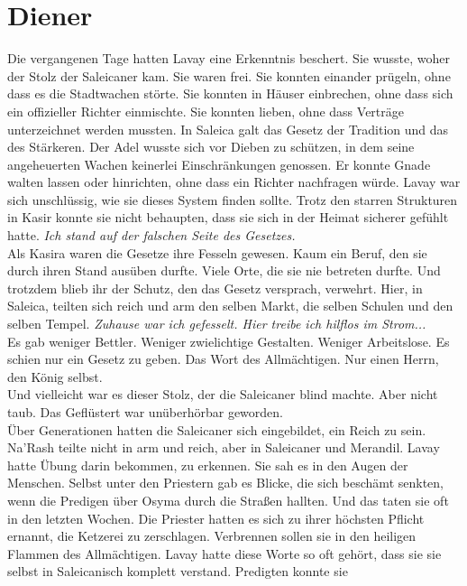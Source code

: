 \chapter{Diener}

Die vergangenen Tage hatten Lavay eine Erkenntnis beschert. Sie wusste, woher der Stolz der 
Saleicaner kam. Sie waren frei. Sie konnten einander prügeln, ohne dass es die Stadtwachen störte. 
Sie konnten in Häuser einbrechen, ohne dass sich ein offizieller Richter einmischte. Sie konnten 
lieben, ohne dass Verträge unterzeichnet werden mussten. In Saleica galt das Gesetz der Tradition 
und das des Stärkeren. Der Adel wusste sich vor Dieben zu schützen, in dem seine angeheuerten 
Wachen keinerlei Einschränkungen genossen. Er konnte Gnade walten lassen oder hinrichten, ohne dass 
ein Richter nachfragen würde. Lavay war sich unschlüssig, wie sie dieses System finden sollte. 
Trotz den starren Strukturen in Kasir konnte sie nicht behaupten, dass sie sich in der Heimat 
sicherer gefühlt hatte. \textit{Ich stand auf der falschen Seite des Gesetzes.}\\
Als Kasira waren die Gesetze ihre Fesseln gewesen. Kaum ein Beruf, den sie durch ihren Stand 
ausüben durfte. Viele Orte, die sie nie betreten durfte. Und trotzdem blieb ihr der Schutz, den das 
Gesetz versprach, verwehrt. Hier, in Saleica, teilten sich reich und arm den selben Markt, die 
selben Schulen und den selben Tempel. \textit{Zuhause war ich gefesselt. Hier treibe ich hilflos im 
Strom...}\\
Es gab weniger Bettler. Weniger zwielichtige Gestalten. Weniger Arbeitslose. Es schien nur ein 
Gesetz zu geben. Das Wort des Allmächtigen. Nur einen Herrn, den König selbst.\\
Und vielleicht war es dieser Stolz, der die Saleicaner blind machte. Aber nicht taub. Das 
Geflüstert war unüberhörbar geworden.\\
Über Generationen hatten die Saleicaner sich eingebildet, ein Reich zu sein. Na'Rash teilte nicht 
in arm und reich, aber in Saleicaner und Merandil. Lavay hatte Übung darin bekommen, zu erkennen. 
Sie sah es in den Augen der Menschen. Selbst unter den Priestern gab es Blicke, die sich beschämt 
senkten, wenn die Predigen über Osyma durch die Straßen hallten. Und das taten sie oft in den 
letzten Wochen. Die Priester hatten es sich zu ihrer höchsten Pflicht ernannt, die Ketzerei zu 
zerschlagen. Verbrennen sollen sie in den heiligen Flammen des Allmächtigen. Lavay hatte diese 
Worte so oft gehört, dass sie sie selbst in Saleicanisch komplett verstand. Predigten konnte sie 
